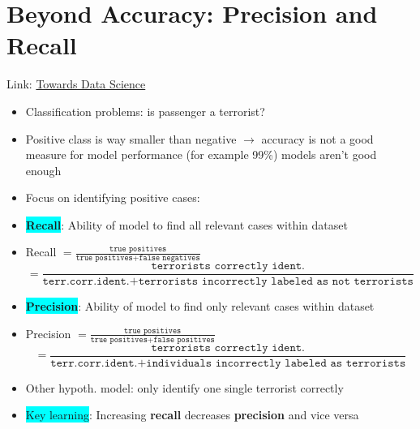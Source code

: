 \documentclass[12pt,a4paper]{article}
\begin{document}
\section{Beyond Accuracy: Precision and Recall}
Link: \href{https://towardsdatascience.com/beyond-accuracy-precision-and-recall-3da06bea9f6c}{Towards Data Science}
\begin{itemize}
\item Classification problems: is passenger a terrorist?
\item Positive class is way smaller than negative $\rightarrow$ accuracy is not a good measure for model performance (for example 99\%) models aren't good enough
\item Focus on identifying positive cases:
\item \colorbox{cyan}{\textbf{Recall}}: Ability of model to find all relevant cases within dataset
\item Recall $= \frac{\texttt{true positives}}{\texttt{true positives} + \texttt{false negatives}}$ \[= \frac{\texttt{terrorists correctly ident.}}{\texttt{terr.corr.ident.}+\texttt{terrorists incorrectly labeled as not terrorists}}\]
\item \colorbox{cyan}{\textbf{Precision}}: Ability of model to find only relevant cases within dataset
\item Precision $= \frac{\texttt{true positives}}{\texttt{true positives} + \texttt{false positives}}$ \[ = \frac{\texttt{terrorists correctly ident.}}{\texttt{terr.corr.ident.}+\texttt{individuals incorrectly labeled as terrorists}}\]
\item Other hypoth. model: only identify one single terrorist correctly
\item \colorbox{cyan}{Key learning}: Increasing \textbf{recall} decreases \textbf{precision} and vice versa
\end{itemize}
\end{document}
